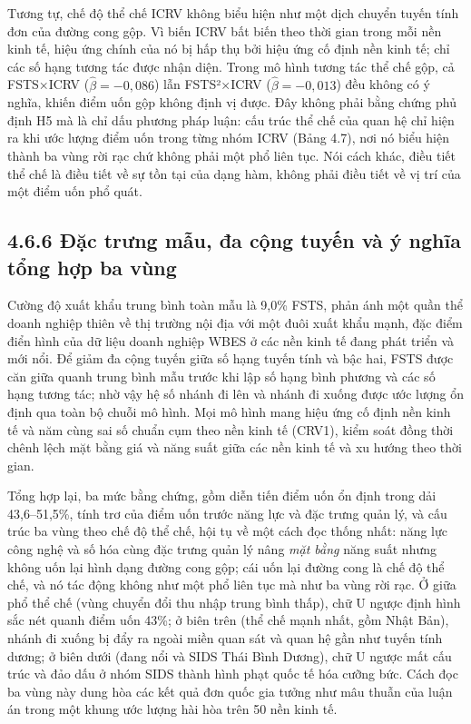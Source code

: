 \documentclass[
  a4paper,
  13pt]{extreport}
\begin{document}
Tương tự, chế độ thể chế ICRV không biểu hiện như một dịch chuyển tuyến
tính đơn của đường cong gộp. Vì biến ICRV bất biến theo thời gian trong
mỗi nền kinh tế, hiệu ứng chính của nó bị hấp thụ bởi hiệu ứng cố định
nền kinh tế; chỉ các số hạng tương tác được nhận diện. Trong mô hình
tương tác thể chế gộp, cả FSTS×ICRV (\(\hat{\beta} = -0{,}086\)) lẫn
FSTS²×ICRV (\(\hat{\beta} = -0{,}013\)) đều không có ý nghĩa, khiến điểm
uốn gộp không định vị được. Đây không phải bằng chứng phủ định H5 mà là
chỉ dấu phương pháp luận: cấu trúc thể chế của quan hệ chỉ hiện ra khi
ước lượng điểm uốn trong từng nhóm ICRV (Bảng 4.7), nơi nó biểu hiện
thành ba vùng rời rạc chứ không phải một phổ liên tục. Nói cách khác,
điều tiết thể chế là điều tiết về sự tồn tại của dạng hàm, không phải
điều tiết về vị trí của một điểm uốn phổ quát.

\hypertarget{ux111ux1eb7c-trux1b0ng-mux1eabu-ux111a-cux1ed9ng-tuyux1ebfn-vuxe0-uxfd-nghux129a-tux1ed5ng-hux1ee3p-ba-vuxf9ng}{%
\subsection{4.6.6 Đặc trưng mẫu, đa cộng tuyến và ý nghĩa tổng hợp ba
vùng}\label{ux111ux1eb7c-trux1b0ng-mux1eabu-ux111a-cux1ed9ng-tuyux1ebfn-vuxe0-uxfd-nghux129a-tux1ed5ng-hux1ee3p-ba-vuxf9ng}}

Cường độ xuất khẩu trung bình toàn mẫu là 9,0\% FSTS, phản ánh một quần
thể doanh nghiệp thiên về thị trường nội địa với một đuôi xuất khẩu
mạnh, đặc điểm điển hình của dữ liệu doanh nghiệp WBES ở các nền kinh tế
đang phát triển và mới nổi. Để giảm đa cộng tuyến giữa số hạng tuyến
tính và bậc hai, FSTS được căn giữa quanh trung bình mẫu trước khi lập
số hạng bình phương và các số hạng tương tác; nhờ vậy hệ số nhánh đi lên
và nhánh đi xuống được ước lượng ổn định qua toàn bộ chuỗi mô hình. Mọi
mô hình mang hiệu ứng cố định nền kinh tế và năm cùng sai số chuẩn cụm
theo nền kinh tế (CRV1), kiểm soát đồng thời chênh lệch mặt bằng giá và
năng suất giữa các nền kinh tế và xu hướng theo thời gian.

Tổng hợp lại, ba mức bằng chứng, gồm diễn tiến điểm uốn ổn định trong
dải 43,6--51,5\%, tính trơ của điểm uốn trước năng lực và đặc trưng quản
lý, và cấu trúc ba vùng theo chế độ thể chế, hội tụ về một cách đọc
thống nhất: năng lực công nghệ và số hóa cùng đặc trưng quản lý nâng
\emph{mặt bằng} năng suất nhưng không uốn lại hình dạng đường cong gộp;
cái uốn lại đường cong là chế độ thể chế, và nó tác động không như một
phổ liên tục mà như ba vùng rời rạc. Ở giữa phổ thể chế (vùng chuyển đổi
thu nhập trung bình thấp), chữ U ngược định hình sắc nét quanh điểm uốn
43\%; ở biên trên (thể chế mạnh nhất, gồm Nhật Bản), nhánh đi xuống bị
đẩy ra ngoài miền quan sát và quan hệ gần như tuyến tính dương; ở biên
dưới (đang nổi và SIDS Thái Bình Dương), chữ U ngược mất cấu trúc và đảo
dấu ở nhóm SIDS thành hình phạt quốc tế hóa cưỡng bức. Cách đọc ba vùng
này dung hòa các kết quả đơn quốc gia tưởng như mâu thuẫn của luận án
trong một khung ước lượng hài hòa trên 50 nền kinh tế.
\end{document}
